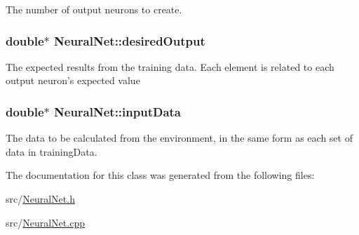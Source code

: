 The number of output neurons to create. \hypertarget{classNeuralNet_db3310c1abfe25972101f3a5f9b45d1e}{
\subsubsection{\setlength{\rightskip}{0pt plus 5cm}double$\ast$ {\bf NeuralNet::desiredOutput}}}
\label{classNeuralNet_db3310c1abfe25972101f3a5f9b45d1e}


The expected results from the training data. Each element is related to each output neuron's expected value \hypertarget{classNeuralNet_a767b858e21d79356577a77f927080fa}{
\subsubsection{\setlength{\rightskip}{0pt plus 5cm}double$\ast$ {\bf NeuralNet::inputData}}}
\label{classNeuralNet_a767b858e21d79356577a77f927080fa}


The data to be calculated from the environment, in the same form as each set of data in trainingData. 

The documentation for this class was generated from the following files:\begin{CompactItemize}
\item 
src/\hyperlink{NeuralNet_8h}{NeuralNet.h}\item 
src/\hyperlink{NeuralNet_8cpp}{NeuralNet.cpp}\end{CompactItemize}
